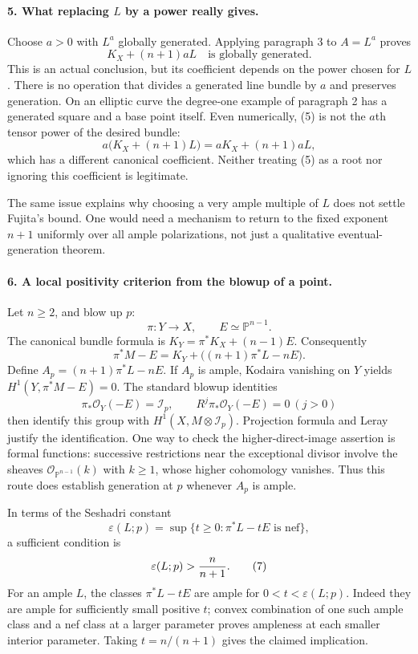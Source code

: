 \documentclass[11pt]{article}
\begin{document}
\paragraph{5. What replacing $L$ by a power really gives.}
Choose $a>0$ with $L^a$ globally generated. Applying paragraph 3 to $A=L^a$ proves
\[
 K_X+(n+1)aL\quad\text{is globally generated}.          \tag{5}
\]
This is an actual conclusion, but its coefficient depends on the power chosen for $L$. There is no operation that divides a generated line bundle by $a$ and preserves generation. On an elliptic curve the degree-one example of paragraph 2 has a generated square and a base point itself. Even numerically, (5) is not the $a$th tensor power of the desired bundle:
\[
 a\bigl(K_X+(n+1)L\bigr)
   =aK_X+(n+1)aL,
\]
which has a different canonical coefficient. Neither treating (5) as a root nor ignoring this coefficient is legitimate.

The same issue explains why choosing a very ample multiple of $L$ does not settle Fujita's bound. One would need a mechanism to return to the fixed exponent $n+1$ uniformly over all ample polarizations, not just a qualitative eventual-generation theorem.

\paragraph{6. A local positivity criterion from the blowup of a point.}
Let $n\ge2$, and blow up $p$:
\[
 \pi:Y\longrightarrow X,\qquad E\simeq\mathbb P^{n-1}.
\]
The canonical bundle formula is $K_Y=\pi^*K_X+(n-1)E$. Consequently
\[
 \pi^*M-E
  =K_Y+\bigl((n+1)\pi^*L-nE\bigr).                    \tag{6}
\]
Define $A_p=(n+1)\pi^*L-nE$. If $A_p$ is ample, Kodaira vanishing on $Y$ yields $H^1(Y,\pi^*M-E)=0$. The standard blowup identities
\[
 \pi_*\mathcal O_Y(-E)=\mathcal I_p,
 \qquad R^j\pi_*\mathcal O_Y(-E)=0\ (j>0)
\]
then identify this group with $H^1(X,M\otimes\mathcal I_p)$. Projection formula and Leray justify the identification. One way to check the higher-direct-image assertion is formal functions: successive restrictions near the exceptional divisor involve the sheaves $\mathcal O_{\mathbb P^{n-1}}(k)$ with $k\ge1$, whose higher cohomology vanishes. Thus this route does establish generation at $p$ whenever $A_p$ is ample.

In terms of the Seshadri constant
\[
 \varepsilon(L;p)=\sup\{t\ge0:\pi^*L-tE\text{ is nef}\},
\]
a sufficient condition is
\[
 \varepsilon(L;p)>{n\over n+1}.                        \tag{7}
\]
For an ample $L$, the classes $\pi^*L-tE$ are ample for $0<t<\varepsilon(L;p)$. Indeed they are ample for sufficiently small positive $t$; convex combination of one such ample class and a nef class at a larger parameter proves ampleness at each smaller interior parameter. Taking $t=n/(n+1)$ gives the claimed implication.
\end{document}
